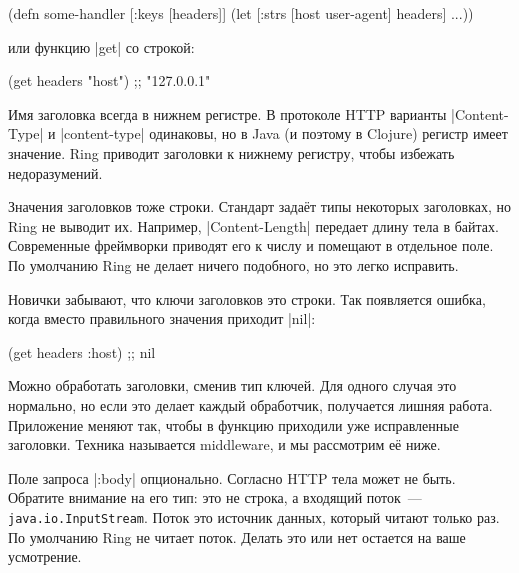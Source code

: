 \begin{english}
  \begin{clojure}
(defn some-handler
  [{:keys [headers]}]
  (let [{:strs [host user-agent]} headers]
    ...))
  \end{clojure}
\end{english}


\noindent
или функцию \spverb|get| со строкой:

\begin{english}
  \begin{clojure}
(get headers "host") ;; "127.0.0.1"
  \end{clojure}
\end{english}


Имя заголовка всегда в нижнем регистре. В протоколе HTTP варианты
\spverb|Content-Type| и \spverb|content-type| одинаковы, но в Java (и поэтому в
Clojure) регистр имеет значение. Ring приводит заголовки к нижнему регистру,
чтобы избежать недоразумений.

Значения заголовков тоже строки. Стандарт зада\"{е}т типы некоторых заголовках,
но Ring не выводит их. Например, \spverb|Content-Length| передает длину тела в
байтах. Современные фреймворки приводят его к числу и помещают в отдельное
поле. По умолчанию Ring не делает ничего подобного, но это легко исправить.

Новички забывают, что ключи заголовков это строки. Так появляется ошибка, когда
вместо правильного значения приходит \spverb|nil|:

\begin{english}
  \begin{clojure}
(get headers :host) ;; nil
  \end{clojure}
\end{english}

Можно обработать заголовки, сменив тип ключей. Для одного случая это
нормально, но если это делает каждый обработчик, получается лишняя
работа. Приложение меняют так, чтобы в функцию приходили уже исправленные
заголовки. Техника называется middleware, и мы рассмотрим е\"{е} ниже.


Поле запроса \spverb|:body| опционально. Согласно HTTP тела может не
быть. Обратите внимание на его тип: это не строка, а входящий поток~---
\verb|java.io.InputStream|. Поток это источник данных, который читают только
раз. По умолчанию Ring не читает поток. Делать это или нет остается на ваше
усмотрение.

